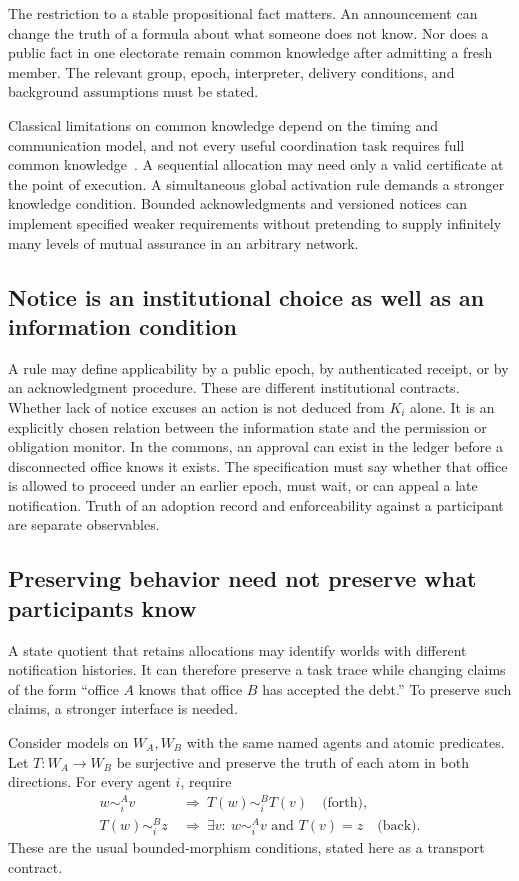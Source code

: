 \documentclass[11pt,letterpaper]{article}
\theoremstyle{plain}
\theoremstyle{definition}
\theoremstyle{remark}
\begin{document}
The restriction to a stable propositional fact matters. An announcement can change the truth of a formula about what someone does not know. Nor does a public fact in one electorate remain common knowledge after admitting a fresh member. The relevant group, epoch, interpreter, delivery conditions, and background assumptions must be stated.

Classical limitations on common knowledge depend on the timing and communication model, and not every useful coordination task requires full common knowledge~\cite{halpernmoses}. A sequential allocation may need only a valid certificate at the point of execution. A simultaneous global activation rule demands a stronger knowledge condition. Bounded acknowledgments and versioned notices can implement specified weaker requirements without pretending to supply infinitely many levels of mutual assurance in an arbitrary network.

\subsection{Notice is an institutional choice as well as an information condition}
A rule may define applicability by a public epoch, by authenticated receipt, or by an acknowledgment procedure. These are different institutional contracts. Whether lack of notice excuses an action is not deduced from $K_i$ alone. It is an explicitly chosen relation between the information state and the permission or obligation monitor. In the commons, an approval can exist in the ledger before a disconnected office knows it exists. The specification must say whether that office is allowed to proceed under an earlier epoch, must wait, or can appeal a late notification. Truth of an adoption record and enforceability against a participant are separate observables.

\subsection{Preserving behavior need not preserve what participants know}
A state quotient that retains allocations may identify worlds with different notification histories. It can therefore preserve a task trace while changing claims of the form ``office $A$ knows that office $B$ has accepted the debt.'' To preserve such claims, a stronger interface is needed.

Consider models on $W_A,W_B$ with the same named agents and atomic predicates. Let $T:W_A\to W_B$ be surjective and preserve the truth of each atom in both directions. For every agent $i$, require
\begin{align*}
w\sim_i^A v&\ \Longrightarrow\ T(w)\sim_i^B T(v) \quad\text{(forth)},\\
T(w)\sim_i^B z&\ \Longrightarrow\ \exists v:\ w\sim_i^A v\text{ and }T(v)=z
\quad\text{(back)}.
\end{align*}
These are the usual bounded-morphism conditions, stated here as a transport contract.
\end{document}
